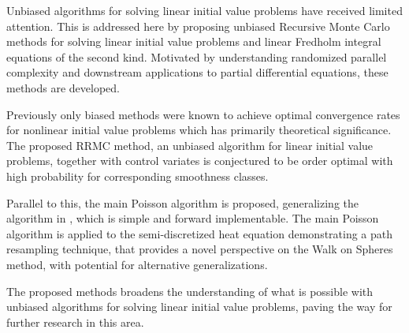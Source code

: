 Unbiased algorithms for solving linear initial value problems have received limited attention.
This is addressed here by proposing unbiased Recursive Monte Carlo methods for solving
linear initial value problems and linear Fredholm integral equations of the second kind. Motivated
by understanding randomized parallel complexity and downstream applications to partial differential
equations, these methods are developed.

Previously only biased methods were known to achieve optimal convergence rates for nonlinear
initial value problems which has primarily theoretical significance.
The proposed RRMC method, an unbiased algorithm for linear initial value problems,
together with control variates is conjectured to be order optimal with high
probability for corresponding smoothness classes.

Parallel to this, the main Poisson algorithm is proposed, generalizing the algorithm in \cite{acebron_monte_2016},
which is simple and forward implementable. The main Poisson algorithm is applied
to the semi-discretized heat equation demonstrating a path resampling technique, that provides
a novel perspective on the Walk on Spheres method, with potential for alternative generalizations.

The proposed methods broadens the understanding of what is possible with unbiased algorithms for
solving linear initial value problems, paving the way for further research in this area.